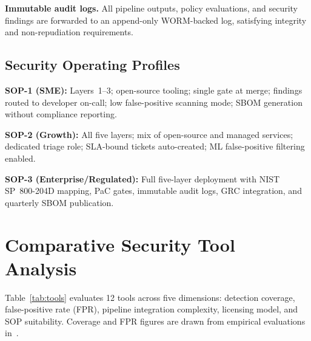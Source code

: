 \documentclass[letterpaper, 10pt, conference]{ieeeconf}
\begin{document}
\textbf{Immutable audit logs.} All pipeline outputs, policy evaluations,
and security findings are forwarded to an append-only WORM-backed log,
satisfying integrity and non-repudiation requirements.

\subsection{Security Operating Profiles}

\textbf{SOP-1 (SME):} Layers~1--3; open-source tooling; single gate
at merge; findings routed to developer on-call; low false-positive
scanning mode; SBOM generation without compliance reporting.

\textbf{SOP-2 (Growth):} All five layers; mix of open-source and
managed services; dedicated triage role; SLA-bound tickets
auto-created; ML false-positive filtering enabled.

\textbf{SOP-3 (Enterprise/Regulated):} Full five-layer deployment
with NIST SP~800-204D mapping, PaC gates, immutable audit logs, GRC
integration, and quarterly SBOM publication.

\section{Comparative Security Tool Analysis}

Table~\ref{tab:tools} evaluates 12 tools across five dimensions:
detection coverage, false-positive rate (FPR), pipeline integration
complexity, licensing model, and SOP suitability. Coverage and FPR
figures are drawn from empirical evaluations in~\cite{singh2020,thota2024}.
\end{document}
